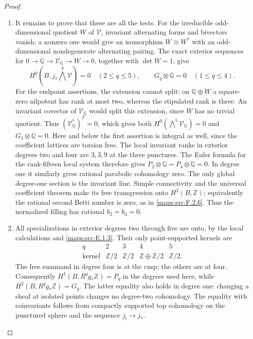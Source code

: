 \documentclass[11pt,a4paper]{article}
\theoremstyle{definition}
\begin{document}
\begin{proof}
\begin{enumerate}[label=\arabic*.]
\item It remains to prove that these are all the tests.
For the irreducible odd-dimensional quotient $W$
of $\mathcal V$, invariant alternating forms and
bivectors vanish: a nonzero one would give an
isomorphism $W\cong W^*$ with an odd-dimensional
nondegenerate alternating pairing.
The exact exterior sequences for
$0\to\mathbb Q\to\mathcal V_{\mathbb Q}\to W\to0$,
together with $\det W=1$, give
\[
 H^0(B,j_*\bigwedge^q\mathcal V)=0
       \quad(2\le q\le5),\qquad
 G_q\otimes\mathbb Q=0\quad(1\le q\le4).
 \tag{F.HC8}\label{maps:eq:F.HC8}
\]
For the endpoint assertions, the extension cannot split:
on $\mathbb Q\oplus W$ a square-zero nilpotent has rank at
most two, whereas the stipulated rank is three.
An invariant covector of $\mathcal V_{\mathbb Q}$ would
split this extension, since $W$ has no trivial quotient.
Thus $(\mathcal V_{\mathbb Q}^*)^\Gamma=0$, which gives
both $H^0(\bigwedge^5\mathcal V_{\mathbb Q})=0$ and
$G_1\otimes\mathbb Q=0$.
Here and below the first assertion is integral as well,
since the coefficient lattices are torsion free.
The local invariant ranks in exterior degrees two
and four are $3,3,9$ at the three punctures.
The Euler formula for the rank-fifteen local system
therefore gives $P_2\otimes\mathbb Q=P_4\otimes\mathbb Q=0$.
In degree one it similarly gives rational parabolic
cohomology zero.
The only global degree-one section is the invariant
line.  Simple connectivity and the universal
coefficient theorem make its free transgression
onto $H^2(B,\mathbb Z)$; equivalently the rational
second Betti number is zero, as in \ref{maps:src:F.2.6}.
Thus the normalized filling has rational $b_2=b_3=0$.

\item All specializations in exterior degrees two through
five are onto, by the local calculations and \ref{maps:src:E.1.3}.
Their only point-supported kernels are
\[
\begin{array}{c|cccc}
q&2&3&4&5\\ \hline
\text{kernel}&\mathbb Z/2&\mathbb Z/2&
                 \mathbb Z\oplus\mathbb Z/2&\mathbb Z/2 .
\end{array}
\tag{F.HC9}\label{maps:eq:F.HC9}
\]
The free summand in degree four is at the cusp; the
others are at four.
Consequently $H^1(B,R^qg_*\mathbb Z)=P_q$ in the
degrees used here, while
$H^2(B,R^qg_*\mathbb Z)=G_q$.
The latter equality also holds in degree one:
changing a sheaf at isolated points changes no
degree-two cohomology.  The equality with coinvariants
follows from compactly supported top cohomology on
the punctured sphere and the sequence $j_!\to j_*$.


\end{enumerate}
\end{proof}
\end{document}
